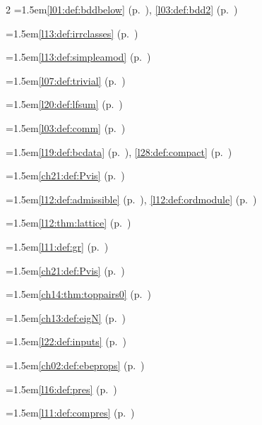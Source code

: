 \begin{multicols}{2}
\hangindent=1.5em\quad \ref{l01:def:bddbelow} (p.~\pageref{l01:def:bddbelow}), \ref{l03:def:bdd2} (p.~\pageref{l03:def:bdd2})\par
\hangindent=1.5em\quad \ref{l13:def:irrclasses} (p.~\pageref{l13:def:irrclasses})\par
\hangindent=1.5em\quad \ref{l13:def:simpleamod} (p.~\pageref{l13:def:simpleamod})\par
\hangindent=1.5em\quad \ref{l07:def:trivial} (p.~\pageref{l07:def:trivial})\par
\hangindent=1.5em\quad \ref{l20:def:lfsum} (p.~\pageref{l20:def:lfsum})\par
\hangindent=1.5em\quad \ref{l03:def:comm} (p.~\pageref{l03:def:comm})\par
\hangindent=1.5em\quad \ref{l19:def:bcdata} (p.~\pageref{l19:def:bcdata}), \ref{l28:def:compact} (p.~\pageref{l28:def:compact})\par
\hangindent=1.5em\quad \ref{ch21:def:Pvis} (p.~\pageref{ch21:def:Pvis})\par
\hangindent=1.5em\quad \ref{l12:def:admissible} (p.~\pageref{l12:def:admissible}), \ref{l12:def:ordmodule} (p.~\pageref{l12:def:ordmodule})\par
\hangindent=1.5em\quad \ref{l12:thm:lattice} (p.~\pageref{l12:thm:lattice})\par
\hangindent=1.5em\quad \ref{l11:def:gr} (p.~\pageref{l11:def:gr})\par
\hangindent=1.5em\quad \ref{ch21:def:Pvis} (p.~\pageref{ch21:def:Pvis})\par
\hangindent=1.5em\quad \ref{ch14:thm:toppairs0} (p.~\pageref{ch14:thm:toppairs0})\par
\hangindent=1.5em\quad \ref{ch13:def:eigN} (p.~\pageref{ch13:def:eigN})\par
\hangindent=1.5em\quad \ref{l22:def:inputs} (p.~\pageref{l22:def:inputs})\par
\hangindent=1.5em\quad \ref{ch02:def:ebeprops} (p.~\pageref{ch02:def:ebeprops})\par
\hangindent=1.5em\quad \ref{l16:def:pres} (p.~\pageref{l16:def:pres})\par
\hangindent=1.5em\quad \ref{l11:def:compres} (p.~\pageref{l11:def:compres})\par

\end{multicols}
